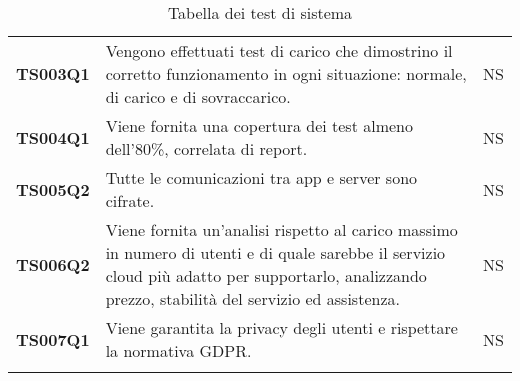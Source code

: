 \documentclass[../piano-di-qualifica.tex]{subfiles}
\begin{document}
\begin{longtable}[H]{>{\centering\bfseries}m{3cm} >{}m{10cm} >{\centering\arraybackslash}m{3cm}}
  TS003Q1            & Vengono effettuati test di carico che dimostrino il corretto funzionamento in ogni situazione: normale, di carico e di sovraccarico.
                     & NS                                                                                                                                                                                                                                                               \\

  TS004Q1            & Viene fornita una copertura dei test almeno dell’80\%, correlata di report.
                     & NS                                                                                                                                                                                                                                                               \\

  TS005Q2            & Tutte le comunicazioni tra app e server sono cifrate.
                     & NS                                                                                                                                                                                                                                                               \\

  TS006Q2            & Viene fornita un’analisi rispetto al carico massimo in numero di utenti e di quale sarebbe il servizio cloud più adatto per supportarlo, analizzando prezzo, stabilità del servizio ed assistenza.
                     & NS                                                                                                                                                                                                                                                               \\

  TS007Q1            & Viene garantita la privacy degli utenti e rispettare la normativa GDPR\@.
                     & NS                                                                                                                                                                                                                                                               \\
  \rowcolor{white}
  \caption{Tabella dei test di sistema}%
  \label{tab:test_sistema}
\end{longtable}
\end{document}
